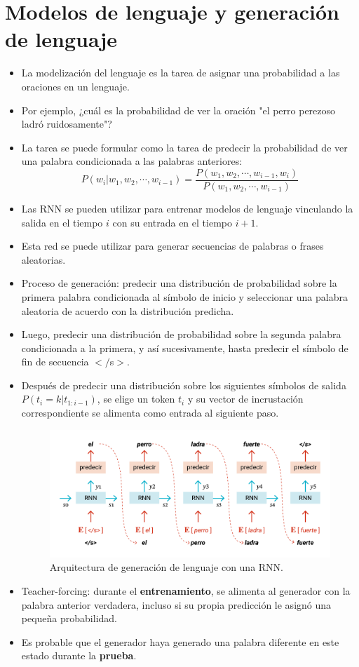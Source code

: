 
\section{Modelos de lenguaje y generación de lenguaje}
\begin{itemize}
\item La modelización del lenguaje es la tarea de asignar una probabilidad a las oraciones en un lenguaje.
\item Por ejemplo, ¿cuál es la probabilidad de ver la oración "el perro perezoso ladró ruidosamente"?
\item La tarea se puede formular como la tarea de predecir la probabilidad de ver una palabra condicionada a las palabras anteriores:
\begin{displaymath}
P(w_i | w_1, w_2, \cdots, w_{i-1}) = \frac{P(w_1, w_2, \cdots, w_{i-1}, w_i)}{P(w_1, w_2, \cdots, w_{i-1})}
\end{displaymath}
\item Las RNN se pueden utilizar para entrenar modelos de lenguaje vinculando la salida en el tiempo $i$ con su entrada en el tiempo $i + 1$.
\item Esta red se puede utilizar para generar secuencias de palabras o frases aleatorias.
\item Proceso de generación: predecir una distribución de probabilidad sobre la primera palabra condicionada al símbolo de inicio y seleccionar una palabra aleatoria de acuerdo con la distribución predicha.
\item Luego, predecir una distribución de probabilidad sobre la segunda palabra condicionada a la primera, y así sucesivamente, hasta predecir el símbolo de fin de secuencia $</$s$>$.
\item Después de predecir una distribución sobre los siguientes símbolos de salida $P(t_i = k | t_{1:i-1})$, se elige un token $t_i$ y su vector de incrustación correspondiente se alimenta como entrada al siguiente paso.
         \begin{figure}[h]
        	\centering
        	\includegraphics[scale = 0.5]{pics/rnnLM.png}
        	\caption{Arquitectura de generación de lenguaje con una RNN.}
        \end{figure}
\item Teacher-forcing: durante el \textbf{entrenamiento}, se alimenta al generador con la palabra anterior verdadera, incluso si su propia predicción le asignó una pequeña probabilidad.
\item Es probable que el generador haya generado una palabra diferente en este estado durante la \textbf{prueba}.
\end{itemize}
